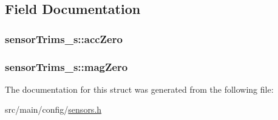 \subsection{Field Documentation}
\hypertarget{structsensorTrims__s_ae2ff01979c78eba7fb34e839f889c1cb}{
\subsubsection[{acc\+Zero}]{ sensor\+Trims\+\_\+s\+::acc\+Zero}}\label{structsensorTrims__s_ae2ff01979c78eba7fb34e839f889c1cb}
\hypertarget{structsensorTrims__s_a7129fe36faf02634bf951658b572dac6}{
\subsubsection[{mag\+Zero}]{ sensor\+Trims\+\_\+s\+::mag\+Zero}}\label{structsensorTrims__s_a7129fe36faf02634bf951658b572dac6}


The documentation for this struct was generated from the following file\+:\begin{DoxyCompactItemize}
\item 
src/main/config/\hyperlink{config_2sensors_8h}{sensors.\+h}\end{DoxyCompactItemize}
